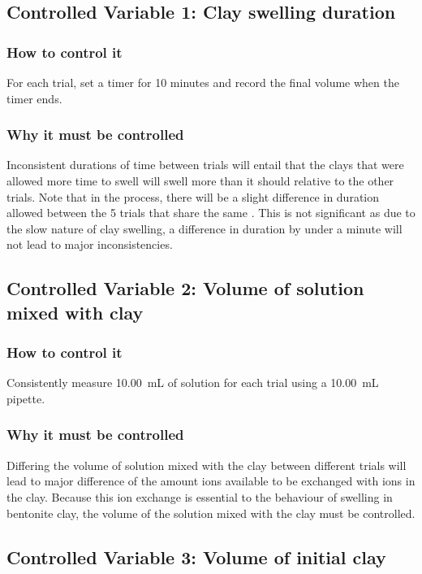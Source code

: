 \documentclass[11pt, letterpaper]{article}
\begin{document}
\begin{paracol}{2}
    \subsection{Controlled Variable 1: Clay swelling duration}
    \subsubsection{How to control it}
    For each trial, set a timer for 10 minutes and record
    the final volume when the timer ends.
    \subsubsection{Why it must be controlled}
    Inconsistent durations of time between trials will entail
    that the clays that were allowed more time to swell will
    swell more than it should relative to the other trials.
    Note that in the process, there will be a slight difference in duration
    allowed between the 5 trials that share the same \ce{[H+]}.
    This is not significant as due to the slow nature of clay swelling,
    a difference in duration by under a minute will not lead to major inconsistencies.
    \switchcolumn
    \subsection{Controlled Variable 2: Volume of solution mixed with clay}
    \subsubsection{How to control it}
    Consistently measure \SI{10.00}{mL} of solution for each trial
    using a \SI{10.00}{mL} pipette.
    \subsubsection{Why it must be controlled}
    Differing the volume of solution mixed with the clay between different
    trials will lead to major difference of the amount  ions available to
    be exchanged with  ions in the clay. Because this ion
    exchange is essential to the behaviour of swelling in bentonite clay,
    the volume of the solution mixed with the clay must be controlled.
\end{paracol}

\subsection{Controlled Variable 3: Volume of initial clay}
\end{document}
